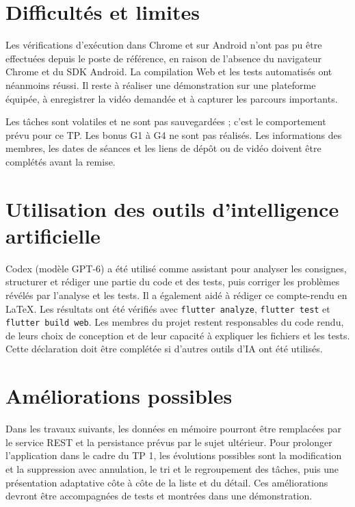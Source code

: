 \documentclass[12pt,a4paper]{report}
\begin{document}
\chapter{Difficultés et limites}

Les vérifications d’exécution dans Chrome et sur Android n’ont pas pu être effectuées depuis le poste de référence, en raison de l’absence du navigateur Chrome et du SDK Android. La compilation Web et les tests automatisés ont néanmoins réussi. Il reste à réaliser une démonstration sur une plateforme équipée, à enregistrer la vidéo demandée et à capturer les parcours importants.

Les tâches sont volatiles et ne sont pas sauvegardées ; c’est le comportement prévu pour ce TP. Les bonus G1 à G4 ne sont pas réalisés. Les informations des membres, les dates de séances et les liens de dépôt ou de vidéo doivent être complétés avant la remise.

\chapter{Utilisation des outils d’intelligence artificielle}

Codex (modèle GPT-6) a été utilisé comme assistant pour analyser les consignes, structurer et rédiger une partie du code et des tests, puis corriger les problèmes révélés par l’analyse et les tests. Il a également aidé à rédiger ce compte-rendu en LaTeX. Les résultats ont été vérifiés avec \texttt{flutter analyze}, \texttt{flutter test} et \texttt{flutter build web}. Les membres du projet restent responsables du code rendu, de leurs choix de conception et de leur capacité à expliquer les fichiers et les tests. Cette déclaration doit être complétée si d’autres outils d’IA ont été utilisés.

\chapter{Améliorations possibles}

Dans les travaux suivants, les données en mémoire pourront être remplacées par le service REST et la persistance prévus par le sujet ultérieur. Pour prolonger l’application dans le cadre du TP 1, les évolutions possibles sont la modification et la suppression avec annulation, le tri et le regroupement des tâches, puis une présentation adaptative côte à côte de la liste et du détail. Ces améliorations devront être accompagnées de tests et montrées dans une démonstration.
\end{document}
